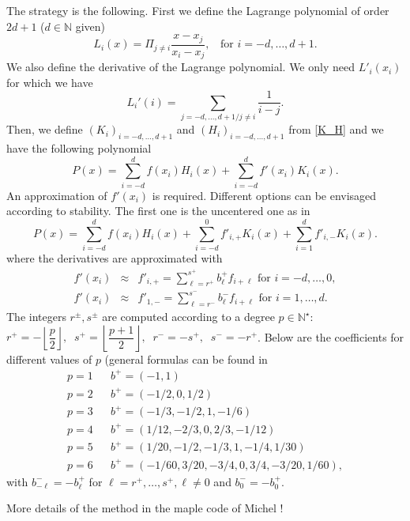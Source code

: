 \documentclass[12pt,english]{article}
\theoremstyle{plain}\newtheorem{theorem}{Theorem}[section]
\theoremstyle{plain}\newtheorem{corollary}{Corollary}[section]
\theoremstyle{plain}\newtheorem{lemma}{Lemma}[section]
\begin{document}
The strategy is the following. First we define the Lagrange polynomial of order  $2d+1$ ($d\in\mathbb{N}$ given) 
$$
L_i(x)=\Pi_{j\neq i} \frac{x-x_j}{x_i-x_j}, \;\; \mbox{ for } i=-d, \dots, d+1. 
$$
We also define the derivative of the Lagrange polynomial. We only need $L'_i(x_i)$ for which we have 
$$
L_i'(i) = \sum_{j=-d, ..., d+1 /  j \neq i} \frac{1}{i-j}. 
$$ 
Then, we define $(K_i)_{i=-d, \dots, d+1}$ and $(H_i)_{i=-d, \dots, d+1}$ from \eqref{K_H} and we have the following polynomial 
$$
P(x) = \sum_{i=-d}^d f(x_i) H_i(x) + \sum_{i=-d}^d f'(x_i) K_i(x). 
$$
An approximation of $f'(x_i)$ is required. Different options can be envisaged according to stability. 
The first one is the uncentered one as in \cite{caim} 
$$
P(x) = \sum_{i=-d}^d f(x_i) H_i(x) + \sum_{i=-d}^0 f'_{i, +} K_i(x)+ \sum_{i=1}^d f'_{i, -} K_i(x). 
$$
where the derivatives are approximated with 
\begin{eqnarray*}
f'(x_i) &\approx& f'_{i, +} = \sum_{\ell = r^+}^{s^+} b_\ell^+ f_{i+\ell}   \mbox{ for } i=-d, \dots, 0, \\ 
f'(x_i) &\approx& f'_{1, -} = \sum_{\ell = r^-}^{s^-} b_\ell^- f_{i+\ell}   \mbox{ for } i=1, \dots, d.  
\end{eqnarray*} 
The integers $r^{\pm}, s^\pm$ are computed according to a degree $p\in \mathbb{N}^\star$: 
$r^+=-\left\lfloor\dfrac{p}{2}\right\rfloor, \;\; s^+=\left\lfloor\dfrac{p+1}{2}\right\rfloor, \;\; r^-=-s^+, \;\; s^-=-r^+$. 
Below are the coefficients for different values of $p$ (general formulas can be found in \cite{caim} 
\begin{eqnarray*}
p=1 && b^+ = (-1, 1)\\
p=2 && b^+ = (-1/2, 0, 1/2)\\
p=3 && b^+ = (-1/3,-1/2,1,-1/6)\\
p=4 && b^+ = (1/12,-2/3,0,2/3,-1/12)\\
p=5 && b^+ = (1/20,-1/2,-1/3,1,-1/4,1/30)\\
p=6 && b^+ = (-1/60,3/20,-3/4,0,3/4,-3/20,1/60), 
\end{eqnarray*}
with $b^-_{-\ell} = -b^+_\ell$ for $\ell=r^+, \dots, s^+, \ell\neq 0$ and $b^-_0 = -b_0^+$. 

More details of the method in the maple code of Michel !  
\end{document}
